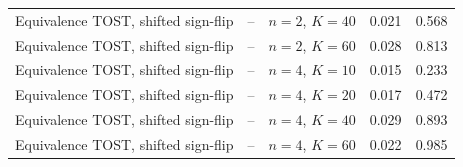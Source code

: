 \begin{table}[t]
\begin{tabular}{lllcc}
Equivalence TOST, shifted sign-flip & -- & $n=2$, $K=40$ & 0.021 & 0.568 \\
Equivalence TOST, shifted sign-flip & -- & $n=2$, $K=60$ & 0.028 & 0.813 \\
Equivalence TOST, shifted sign-flip & -- & $n=4$, $K=10$ & 0.015 & 0.233 \\
Equivalence TOST, shifted sign-flip & -- & $n=4$, $K=20$ & 0.017 & 0.472 \\
Equivalence TOST, shifted sign-flip & -- & $n=4$, $K=40$ & 0.029 & 0.893 \\
Equivalence TOST, shifted sign-flip & -- & $n=4$, $K=60$ & 0.022 & 0.985 \\
\bottomrule\end{tabular}\end{table}
